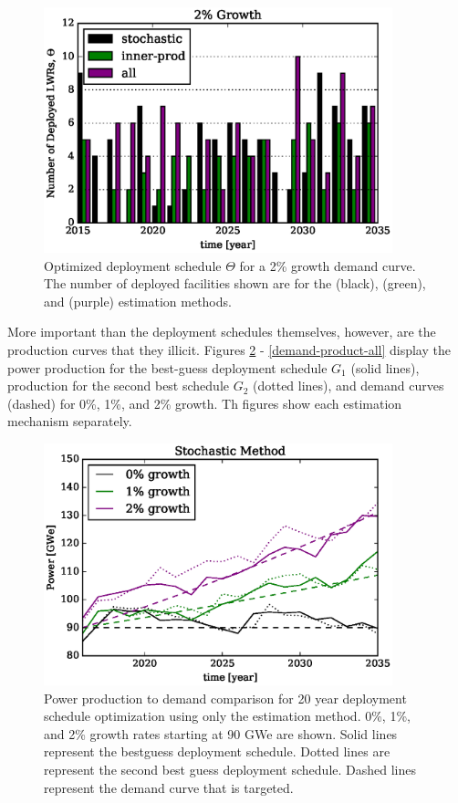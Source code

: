 \begin{figure}[htb]
\centering
\includegraphics[width=0.9\textwidth]{deploy-2.eps}
\caption{Optimized deployment schedule $\Theta$ for a 2\% growth 
demand curve. The number of deployed facilities shown are 
for the \stochastic (black), \innerprod (green), and \allflag (purple)
estimation methods.}
\label{deploy-2}
\end{figure}

\clearpage

More important than the deployment schedules themselves, however, are the
production curves that they illicit.
Figures \ref{demand-product-stochastic} - 
\ref{demand-product-all} display the
power production for the best-guess deployment schedule $G_1$ (solid lines),
production for the second best schedule $G_2$ (dotted lines), 
and demand curves (dashed) for 0\%, 1\%, and 2\% growth. 
Th figures show each estimation mechanism separately.

\begin{figure}[htb]
\centering
\includegraphics[width=0.9\textwidth]{demand-product-stochastic.eps}
\caption{Power production to demand comparison for 20 year deployment 
schedule optimization using only the \stochastic estimation method.
0\%, 1\%, and 2\% growth rates starting at 90 GWe are shown. Solid lines 
represent the bestguess deployment schedule.  Dotted lines are represent 
the second best guess deployment schedule. Dashed lines represent the 
demand curve that is targeted.
}
\label{demand-product-stochastic}
\end{figure}

